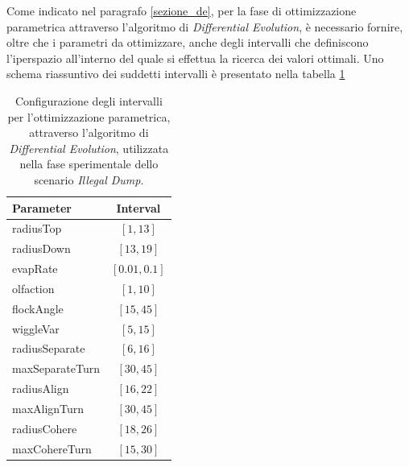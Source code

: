 Come indicato nel paragrafo \ref{sezione_de}, per la fase di ottimizzazione parametrica attraverso l'algoritmo di \textit{Differential Evolution}, è necessario fornire, oltre che i parametri da ottimizzare, anche degli intervalli che definiscono l'iperspazio all'interno del quale si effettua la ricerca dei valori ottimali.
Uno schema riassuntivo dei suddetti intervalli è presentato nella tabella \ref{tabella_intervalli_dump}

\begin{table}[H]
    \centering
    
    \begin{tabular}{|l|c|}
    \hline
    \textbf{Parameter}              & \textbf{Interval}                 \\ \hline
    radiusTop                       & $[1,13]$                          \\ \hline
    radiusDown                      & $[13,19]$                         \\ \hline
    evapRate                        & $[0.01,0.1]$                      \\ \hline
    olfaction                       & $[1,10]$                          \\ \hline
    flockAngle                      & $[15,45]$                         \\ \hline
    wiggleVar                       & $[5,15]$                          \\ \hline
    radiusSeparate                  & $[6,16]$                          \\ \hline
    maxSeparateTurn                 & $[30,45]$                         \\ \hline
    radiusAlign                     & $[16,22]$                         \\ \hline
    maxAlignTurn                    & $[30,45]$                         \\ \hline
    radiusCohere                    & $[18,26]$                         \\ \hline
maxCohereTurn                       & $[15,30]$                         \\ \hline
    \end{tabular}%
    
    \caption{Configurazione degli intervalli per l'ottimizzazione parametrica, attraverso l'algoritmo di \textit{Differential Evolution}, utilizzata nella fase sperimentale dello scenario \textit{Illegal Dump}.}
    \label{tabella_intervalli_dump}
\end{table}

